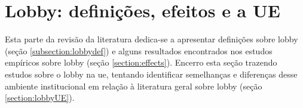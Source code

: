 \section{Lobby: definições, efeitos e a UE}
\label{section:lobby}

Esta parte da revisão da literatura dedica-se a apresentar definições sobre lobby (seção \ref{subsection:lobbydef}) e alguns resultados encontrados nos estudos empíricos sobre lobby (seção \ref{section:effects}). Encerro esta seção trazendo estudos sobre o lobby na \acrshort{ue}, tentando identificar semelhanças e diferenças desse ambiente institucional em relação à literatura geral sobre lobby (seção \ref{section:lobbyUE}).






